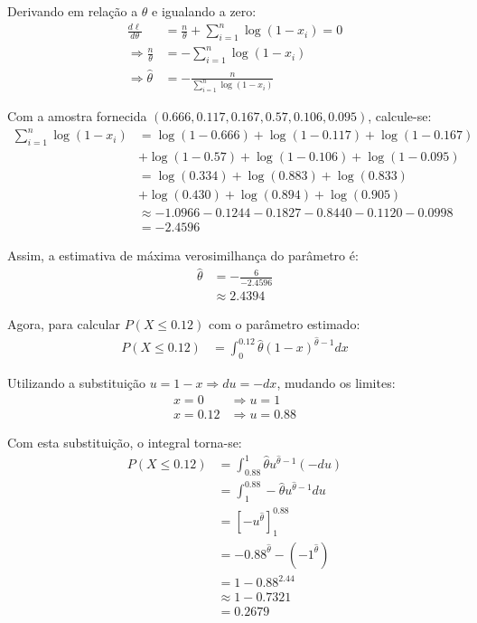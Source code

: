 \documentclass[a4paper,12pt]{article}
\begin{document}
\begin{enumerate}
\begin{mdframed}[backgroundcolor=gray!10, linewidth=0pt, innertopmargin=10pt, innerbottommargin=10pt]
    Derivando em relação a \( \theta \) e igualando a zero:
    \begin{align*}
    \frac{d\ell}{d\theta} &= \frac{n}{\theta} + \sum_{i=1}^{n} \log(1 - x_i) = 0 \\
    \Rightarrow \frac{n}{\theta} &= -\sum_{i=1}^{n} \log(1 - x_i) \\
    \Rightarrow \hat{\theta} &= -\frac{n}{\sum_{i=1}^{n} \log(1 - x_i)}
    \end{align*}

    Com a amostra fornecida \( (0.666, 0.117, 0.167, 0.57, 0.106, 0.095) \), calcule-se:
    \begin{align*}
    \sum_{i=1}^{n} \log(1 - x_i) &= \log(1-0.666) + \log(1-0.117) + \log(1-0.167) \\
    &+ \log(1-0.57) + \log(1-0.106) + \log(1-0.095) \\
    &= \log(0.334) + \log(0.883) + \log(0.833) \\
    &+ \log(0.430) + \log(0.894) + \log(0.905) \\
    &\approx -1.0966 -0.1244 -0.1827 -0.8440 -0.1120 -0.0998 \\ %
    &= -2.4596 %
    \end{align*}

    Assim, a estimativa de máxima verosimilhança do parâmetro é:
    \begin{align*}
    \hat{\theta} &= -\frac{6}{-2.4596} \\
    &\approx 2.4394
    \end{align*}

    Agora, para calcular \( P(X \leq 0.12) \) com o parâmetro estimado:
    \begin{align*}
    P(X \leq 0.12) &= \int_0^{0.12} \hat{\theta}(1 - x)^{\hat{\theta} - 1} dx
    \end{align*}

    Utilizando a substituição \( u = 1 - x \Rightarrow du = -dx \), mudando os limites:
    \begin{align*}
    x = 0 &\Rightarrow u = 1 \\
    x = 0.12 &\Rightarrow u = 0.88
    \end{align*}

    Com esta substituição, o integral torna-se:
    \begin{align*}
    P(X \leq 0.12) &= \int_{0.88}^{1} \hat{\theta} u^{\hat{\theta} - 1} (-du) \\
    &= \int_{1}^{0.88} -\hat{\theta} u^{\hat{\theta} - 1} du \\
    &= \left[ -u^{\hat{\theta}} \right]_{1}^{0.88} \\
    &= -0.88^{\hat{\theta}} - (-1^{\hat{\theta}}) \\
    &= 1 - 0.88^{2.44} \\
    &\approx 1 - 0.7321 \\
    &= 0.2679
    \end{align*}


\end{mdframed}
\end{enumerate}
\end{document}
